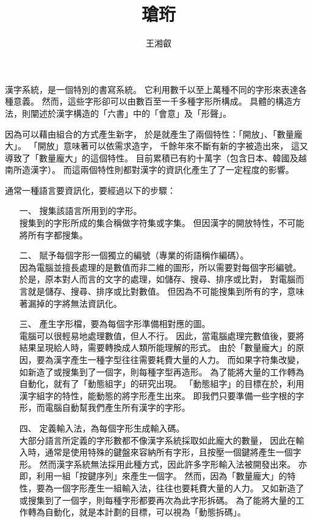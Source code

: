 \documentclass{article}
\title{瑲珩}
\author{王湘叡}
\begin{document}
\maketitle{}

漢字系統，是一個特別的書寫系統。%
它利用數千以至上萬種不同的字形來表達各種意義。%
然而，這些字形卻可以由數百至一千多種字形所構成。
具體的構造方法，則闡述於漢字構造的「六書」中的「會意」及「形聲」。

因為可以藉由組合的方式產生新字，%
於是就產生了兩個特性：「開放」、「數量龐大」。%
「開放」意味著可以依需求造字，%
千餘年來不斷有新的字被造出來，%
這又導致了「數量龐大」的這個特性。%
目前累積已有約十萬字（包含日本、韓國及越南所造漢字）。%
而這兩個特性則都對漢字的資訊化產生了了一定程度的影響。

通常一種語言要資訊化，要經過以下的步驟：
\begin{enumerate}
\item[一、]搜集該語言所用到的字形。\\
搜集到的字形所成的集合稱做字符集或字集。%
但因漢字的開放特性，不可能將所有字都搜集。

\item[二、]賦予每個字形一個獨立的編號（專業的術語稱作編碼）。\\
因為電腦並擅長處理的是數值而非二維的圖形，所以需要對每個字形編號。%
於是，原本對人而言的文字的處理，如儲存、搜尋、排序或比對，%
對電腦而言就是儲存、搜尋、排序或比對數值。%
但因為不可能搜集到所有的字，意味著漏掉的字將無法資訊化。

\item[三、]產生字形檔，要為每個字形準備相對應的圖。\\
電腦可以很輕易地處理數值，但人不行。%
因此，當電腦處理完數值後，要將結果呈現給人時，需要轉換成人類所能理解的形式。%
由於「數量龐大」的原因，要為漢字產生一種字型往往需要耗費大量的人力。%
而如果字符集改變，如新造了或搜集到了一個字，則每種字型再造形。%
為了能將大量的工作轉為自動化，就有了「動態組字」的研究出現。%
「動態組字」的目標在於，利用漢字組字的特性，能動態的將字形產生出來。%
即我們只要準備一些字根的字形，而電腦自動幫我們產生所有漢字的字形。

\item[四、]定義輸入法，為每個字形生成輸入碼。\\
大部分語言所定義的字形數都不像漢字系統採取如此龐大的數量，%
因此在輸入時，通常是使用特殊的鍵盤來容納所有字形，且按壓一個鍵將產生一個字形。
然而漢字系統無法採用此種方式，因此許多字形輸入法被開發出來。%
亦即，利用一組「按鍵序列」來產生一個字。%
然而，因為「數量龐大」的特性，要為一個字形產生一組輸入法，往往也要耗費大量的人力。%
又如新造了或搜集到了一個字，則每種字形都要再次為此字形拆碼。%
為了能將大量的工作轉為自動化，就是本計劃的目標，可以視為「動態拆碼」。

\end{enumerate}
\end{document}
